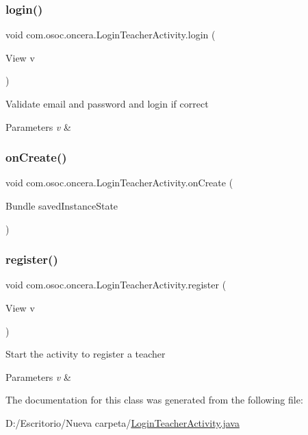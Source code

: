 \subsubsection{\texorpdfstring{login()}{login()}}
{\footnotesize\ttfamily void com.\+osoc.\+oncera.\+Login\+Teacher\+Activity.\+login (\begin{DoxyParamCaption}\item[{View}]{v }\end{DoxyParamCaption})}

Validate email and password and login if correct 
\begin{DoxyParams}{Parameters}
{\em v} & \\
\hline
\end{DoxyParams}
\mbox{\label{classcom_1_1osoc_1_1oncera_1_1_login_teacher_activity_af246f6a1292bb01afae15c9254184a69}} 
\subsubsection{\texorpdfstring{onCreate()}{onCreate()}}
{\footnotesize\ttfamily void com.\+osoc.\+oncera.\+Login\+Teacher\+Activity.\+on\+Create (\begin{DoxyParamCaption}\item[{Bundle}]{saved\+Instance\+State }\end{DoxyParamCaption})\hspace{0.3cm}{\ttfamily [protected]}}

\mbox{\label{classcom_1_1osoc_1_1oncera_1_1_login_teacher_activity_a1045d9fd21387400e0a14dbf9a7b41cc}} 
\subsubsection{\texorpdfstring{register()}{register()}}
{\footnotesize\ttfamily void com.\+osoc.\+oncera.\+Login\+Teacher\+Activity.\+register (\begin{DoxyParamCaption}\item[{View}]{v }\end{DoxyParamCaption})}

Start the activity to register a teacher 
\begin{DoxyParams}{Parameters}
{\em v} & \\
\hline
\end{DoxyParams}


The documentation for this class was generated from the following file\+:\begin{DoxyCompactItemize}
\item 
D\+:/\+Escritorio/\+Nueva carpeta/\mbox{\hyperlink{_login_teacher_activity_8java}{Login\+Teacher\+Activity.\+java}}\end{DoxyCompactItemize}
